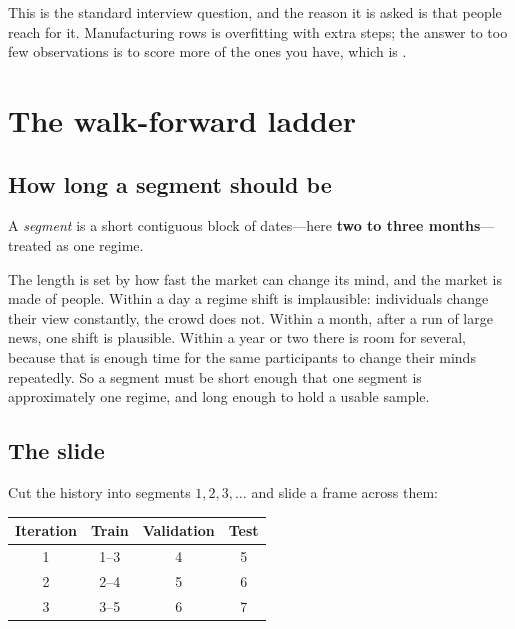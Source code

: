 \begin{note}
This is the standard interview question, and the reason it is asked is that people reach for it.
Manufacturing rows is overfitting with extra steps; the answer to too few observations is to score
more of the ones you have, which is .
\end{note}


\section{The walk-forward ladder}\label{sec:ladder}

\subsection{How long a segment should be}\label{sec:segment-length}

\begin{definition}[Segment]\label{def:segment}
A \emph{segment} is a short contiguous block of dates---here \textbf{two to three months}---treated
as one regime.
\end{definition}

The length is set by how fast the market can change its mind, and the market is made of people.
Within a day a regime shift is implausible: individuals change their view constantly, the crowd
does not. Within a month, after a run of large news, one shift is plausible. Within a year or two
there is room for several, because that is enough time for the same participants to change their
minds repeatedly. So a segment must be short enough that one segment is approximately one regime,
and long enough to hold a usable sample.

\subsection{The slide}\label{sec:slide}

Cut the history into segments $1, 2, 3, \ldots$ and slide a frame across them:

\begin{center}
\begin{tabular}{|c|c|c|c|}
\hline
\textbf{Iteration} & \textbf{Train} & \textbf{Validation} & \textbf{Test} \\ \hline
1 & 1--3 & 4 & 5 \\ \hline
2 & 2--4 & 5 & 6 \\ \hline
3 & 3--5 & 6 & 7 \\ \hline
\end{tabular}
\end{center}

